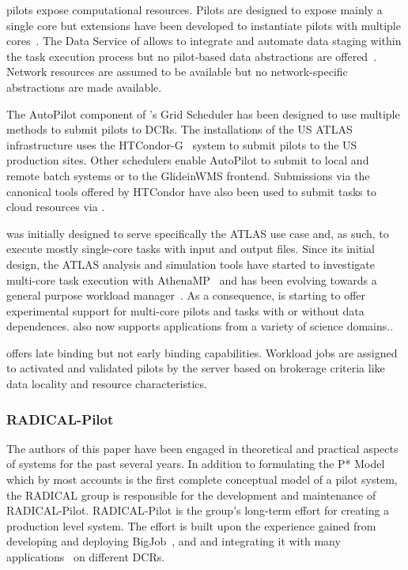 \documentclass{sig-alternate}
\begin{document}

\panda pilots expose computational resources. Pilots are designed to expose
mainly a single core but extensions have been developed to instantiate pilots
with multiple cores~\cite{crooks2012multi}. The Data Service of \panda allows to
integrate and automate data staging within the task execution process but no
pilot-based data abstractions are offered~\cite{maeno2012pd2p}. Network
resources are assumed to be available but no network-specific abstractions are
made available.

The AutoPilot component of \panda's Grid Scheduler has been designed to use
multiple methods to submit pilots to DCRs. The \panda installations of the US
ATLAS infrastructure uses the HTCondor-G~\cite{frey2002condorG} system to submit
pilots to the US production sites. Other schedulers enable AutoPilot to submit
to local and remote batch systems or to the GlideinWMS frontend. Submissions via
the canonical tools offered by HTCondor have also been used to submit tasks to
cloud resources via
\panda.

\panda was initially designed to serve specifically the ATLAS use case and, as
such, to execute mostly single-core tasks with input and output files. Since its
initial design, the ATLAS analysis and simulation tools have started to
investigate multi-core task execution with AthenaMP~\cite{crooks2012multi} and
\panda has been evolving towards a general purpose workload
manager~\cite{maeno2014evolution}. As a consequence, \panda is starting to offer
experimental support for multi-core pilots and tasks with or without data
dependences. \panda also now supports applications from a variety of science
domains.\cite{x,y}.

\panda offers late binding but not early binding capabilities. Workload jobs are
assigned to activated and validated pilots by the \panda server based on
brokerage criteria like data locality and resource characteristics.

%
\subsubsection{RADICAL-Pilot}
\label{sec:radical_pilot}

The authors of this paper have been engaged in theoretical and practical aspects
of \pilot systems for the past several years. In addition to formulating the P*
Model~\cite{luckow2012} which by most accounts is the first complete conceptual
model of a pilot system, the RADICAL group is responsible for the development
and maintenance of RADICAL-Pilot\cite{merzky2015radical,rp_url}. RADICAL-Pilot
is the group's long-term effort for creating a production level \pilot system.
The effort is built upon the experience gained from developing and deploying
BigJob~\cite{luckow2010}, and and integrating it with many
applications~\cite{ko2010efficient,kim2010exploring,ct500776j} on different DCRs.
\end{document}
